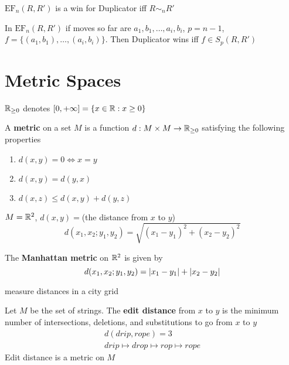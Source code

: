 \documentclass[11pt]{article}
\def \EF {\text{EF}}
\begin{document}
\begin{proposition}[]
\(\EF_n(R,R')\) is a win for Duplicator iff \(R\sim_nR'\)
\end{proposition}

\begin{proposition}[]
In \(\EF_n(R,R')\) if moves so far are \(a_1,b_1,\dots,a_i,b_i\), \(p=n-1\), \(f=\{(a_1,b_1),\dots,(a_i,b_i)\}\).
Then Duplicator wins iff \(f\in S_p(R,R')\)
\end{proposition}

\appendix
\section{Metric Spaces}
\label{sec:org65b4cf5}
\(\mathbb{R}_{\ge 0}\) denotes \([0,+\infty]=\{x\in\mathbb{R}:x\ge 0\}\)
\begin{definition}[]
A \textbf{metric} on a set \(M\) is a function \(d:M\times M\to\mathbb{R}_{\ge 0}\) satisfying the following properties
\begin{enumerate}
\item \(d(x,y)=0\Leftrightarrow x=y\)
\item \(d(x,y)=d(y,x)\)
\item \(d(x,z)\le d(x,y)+d(y,z)\)
\end{enumerate}
\end{definition}

\begin{examplle}[]
\(M=\mathbb{R}^2\), \(d(x,y)=\)(the distance from \(x\) to \(y\))
\begin{equation*}
  d(x_1,x_2;y_1,y_2)=\sqrt{(x_1-y_1)^2+(x_2-y_2)^2}
\end{equation*}
\end{examplle}

\begin{examplle}[]
The \textbf{Manhattan metric} on \(\mathbb{R}^2\) is given by
\begin{equation*}
  d(x_1,x_2;y_1,y_2)=\abs{x_1-y_1}+\abs{x_2-y_2}
\end{equation*}

measure distances in a city grid
\end{examplle}

\begin{examplle}[]
Let \(M\) be the set of strings. The \textbf{edit distance} from \(x\) to \(y\) is the minimum number of
intersections, deletions, and substitutions to go from \(x\) to \(y\)
\begin{gather*}
  d(drip,rope)=3\\
  drip\mapsto drop\mapsto rop\mapsto rope
\end{gather*}
Edit distance is a metric on \(M\)
\end{examplle}
\end{document}
